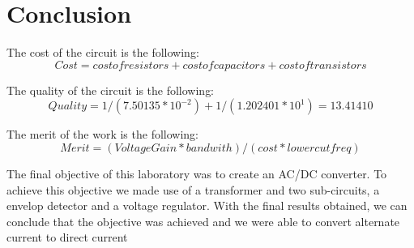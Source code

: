 \section{Conclusion}
\label{sec:conclusion}

The cost of the circuit is the following:
\begin{equation}
Cost = cost of resistors + cost of capacitors + cost of transistors
\end{equation}

The quality of the circuit is the following:
\begin{equation}
Quality = 1/(7.50135*10^{-2}) + 1/(1.202401*10^{1}) = 13.41410
\end{equation}

The merit of the work is the following:
\begin{equation}
Merit = (Voltage Gain * bandwith) / (cost * lower cut freq)
\end{equation}

The final objective of this laboratory was to create an AC/DC converter.
To achieve this objective we made use of a transformer and two sub-circuits, a envelop detector and a voltage regulator.
With the final results obtained, we can conclude that the objective was achieved and we were able to convert alternate current to direct current
